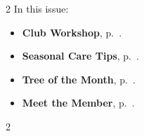 \setlength{\columnsep}{-5.0cm}
\begin{multicols}{2}
    \noindent\textsf{In this issue:}
    \begin{itemize}
        \item \textsf{\textbf{Club Workshop}}, p.~\pageref{2025-01-potting}.
        \item \textsf{\textbf{Seasonal Care Tips}}, p.~\pageref{2025-01-care}.
        \item \textsf{\textbf{Tree of the Month}}, p.~\pageref{2025-01-contest}.
        \item \textsf{\textbf{Meet the Member}}, p.~\pageref{2025-01-roots}.
    \end{itemize}
    \vfill\null
    \columnbreak

    
\end{multicols}
\pagebreak

\setlength{\columnsep}{0.5cm}
\begin{multicols}{2}
    
    
    
%    
    
%    
%    
\end{multicols}
